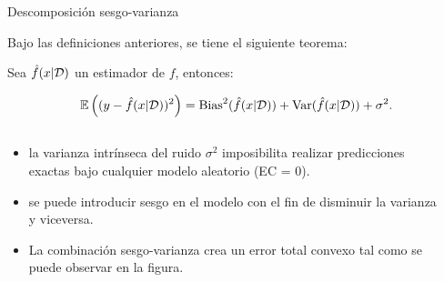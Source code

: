 \documentclass[9pt, handout]{beamer}
\begin{document}
\begin{frame}{Descomposición sesgo-varianza}
	
	Bajo las definiciones anteriores, se tiene el siguiente teorema:

\begin{theorem} Sea $\hat{f}(x|{\mathcal D})$ un estimador de $f$, entonces:

\begin{equation*}
	\operatorname{\mathbb{E}}\left((y-\hat{f}(x|{\mathcal D}))^2\right) = \text{Bias}^2(\hat{f}(x|{\mathcal D})) + \text{Var}(\hat{f}(x|{\mathcal D})) + \sigma^2.
\end{equation*}
	
\end{theorem}\pause

\begin{columns}

\begin{column}{0.6\textwidth}

\begin{itemize}
	\item la varianza intrínseca del ruido $\sigma^2$ imposibilita realizar predicciones exactas bajo cualquier modelo aleatorio (EC = 0). \pause
	\item se puede introducir sesgo en el modelo con el fin de disminuir la varianza y viceversa.\pause
	\item La combinación sesgo-varianza crea un error total convexo tal como se puede observar en la figura.
\end{itemize}

\end{column}

\begin{column}{0.4\textwidth}


\end{column}
\end{columns}
\end{frame}
\end{document}
